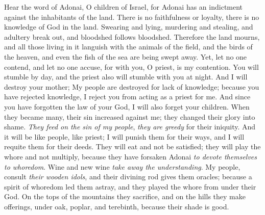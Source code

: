 \begin{biblechapter} %
 Hear the word of Adonai, O children of Israel, 
for Adonai has an indictment against the inhabitants of the land. 
There is no faithfulness or loyalty, 
there is no knowledge of God in the land.
\verse Swearing and lying, 
murdering and stealing, 
and adultery break out, 
and bloodshed follows bloodshed.
\verse Therefore the land mourns, 
and all those living in it languish 
with the animals of the field, 
and the birds of the heaven, 
and even the fish of the sea 
are being swept away.
\verse Yet, let no one contend, 
and let no one accuse, 
for with you, O priest, is my contention.
\verse You will stumble by day, 
and the priest also will stumble 
with you at night. 
And I will destroy your mother;
\verse My people are destroyed 
for lack of knowledge; 
because you have rejected knowledge, 
I reject you from acting as a priest for me. 
And since you have forgotten the law of your God, 
I will also forget your children.
\verse When they became many, their sin increased against me; 
they changed their glory into shame.
\verse \textit{They feed on the sin of my people}, 
\textit{they are greedy} for their iniquity.
\verse And it will be like people, like priest; 
I will punish them for their ways, 
and I will requite them for their deeds.
\verse They will eat and not be satisfied; 
they will play the whore and not multiply, 
because they have forsaken Adonai \textit{to devote themselves to
\verse whoredom}. 
Wine and new wine \textit{take away the understanding}.
\verse My people, 
consult \textit{their wooden idols}, 
and their divining rod gives them oracles; 
because a spirit of whoredom led them astray, 
and they played the whore from under their God.
\verse On the tops of the mountains they sacrifice, 
and on the hills they make offerings, 
under oak, poplar, and terebinth, 
because their shade is good. 

\end{biblechapter}

